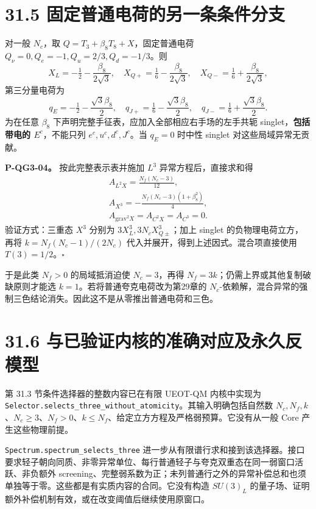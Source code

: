 \documentclass[
  11pt,
  oneside]{book}
\begin{document}
\section{31.5 固定普通电荷的另一条条件分支}

对一般 \(N_c\)，取 \(Q=T_3+\beta_8T_8+X\)，固定普通电荷
\(Q_\nu=0,Q_e=-1,Q_u=2/3,Q_d=-1/3\)。则 \[
X_L=-\tfrac12-\frac{\beta_8}{2\sqrt3},\quad
X_{Q+}=\tfrac16-\frac{\beta_8}{2\sqrt3},\quad
X_{Q-}=\tfrac16+\frac{\beta_8}{2\sqrt3},
\] 第三分量电荷为 \[
q_E=-\tfrac12-\frac{\sqrt3\beta_8}{2},\quad
q_{J+}=\tfrac16-\frac{\sqrt3\beta_8}{2},\quad
q_{J-}=\tfrac16+\frac{\sqrt3\beta_8}{2}.
\] 为在任意 \(\beta_8\) 下声明完整手征表，应加入全部相应右手场的左手共轭
singlet，\textbf{包括带电的 \(E^c\)}，不能只列 \(e^c,u^c,d^c,J^c\)。当
\(q_E=0\) 时中性 singlet 对这些局域异常无贡献。

\protect\hypertarget{p-qg3-04}{}{}

\textbf{P-QG3-04。} 按此完整表示表并施加 \(L^3\) 异常方程后，直接求和得
\[
\begin{gathered}
A_{L^2X}=\frac{N_f(N_c-3)}{12},\\
A_{X^3}=-\frac{N_f(N_c-3)(1+\beta_8^2)}4,
\\ A_{\mathrm{grav}^2X}=A_{C^2X}=A_{C^3}=0.
\end{gathered}
\] 验证方式：三重态 \(X^3\) 分别为 \(3X_L^3,3N_cX_{Q\pm}^3\)；加上
singlet 的负物理电荷立方，再将 \(k=N_f(N_c-1)/(2N_c)\)
代入并展开，得到上述因式。混合项直接使用 \(T(3)=1/2\)。\(\square\)

于是此类 \(N_f>0\) 的局域抵消迫使 \(N_c=3\)，再得
\(N_f=3k\)；仍需上界或其他复制破缺原则才能选
\(k=1\)。若将普通夸克电荷改为第29章的
\(N_c\)-依赖解，混合异常的强制三色结论消失。因此这不是从零推出普通电荷和三色。

\section{31.6 与已验证内核的准确对应及永久反模型}

第 31.3 节条件选择器的整数内容已在有限 UEOT-QM 内核中实现为
\texttt{Selector.\allowbreak selects\_\allowbreak three\_\allowbreak without\_\allowbreak atomicity}。其输入明确包括自然数
\(N_c,N_f,k\)、\(N_c\ge3\)、\(N_f>0\)、\(k\le N_f\)、给定立方方程及严格弱预算。它没有从一般
Core 产生这些物理前提。

\texttt{Spectrum.\allowbreak spectrum\_\allowbreak selects\_\allowbreak three}
进一步从有限谱行求和接到该选择器。接口要求轻子朝向同质、非零异常单位、每行普通轻子与夸克双重态在同一弱窗口活跃、非负额外
screening、完整弱系数为正；未列普通行之外的异常补偿总和也须单独等于零。这些都是有实质内容的合同。它没有构造
\(SU(3)_L\)
的量子场、证明额外补偿机制有效，或在改变阈值后继续使用原窗口。
\end{document}
